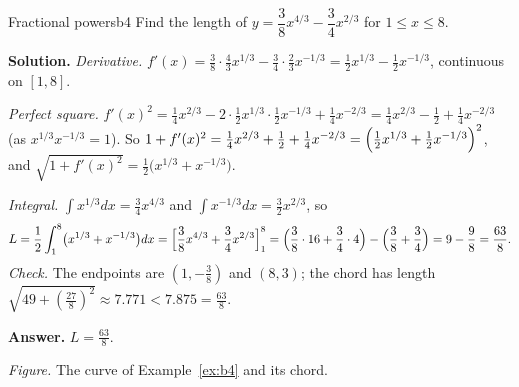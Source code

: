 \documentclass[11pt]{article}
\begin{document}
\begin{exmp}{Fractional powers}{b4}
Find the length of $y=\dfrac38x^{4/3}-\dfrac34x^{2/3}$ for $1\le x\le8$.

\textbf{Solution.} \emph{Derivative.} $f'(x)=\frac38\cdot\frac43x^{1/3}-\frac34\cdot\frac23x^{-1/3}=\frac12x^{1/3}-\frac12x^{-1/3}$, continuous on $[1,8]$.

\emph{Perfect square.} $f'(x)^2=\frac14x^{2/3}-2\cdot\frac12x^{1/3}\cdot\frac12x^{-1/3}+\frac14x^{-2/3}=\frac14x^{2/3}-\frac12+\frac14x^{-2/3}$ (as $x^{1/3}x^{-1/3}=1$). So $1+f'(x)^2=\frac14x^{2/3}+\frac12+\frac14x^{-2/3}=\Bigl(\frac12x^{1/3}+\frac12x^{-1/3}\Bigr)^2$, and $\sqrt{1+f'(x)^2}=\frac12\bigl(x^{1/3}+x^{-1/3}\bigr)$.

\emph{Integral.} $\int x^{1/3}dx=\frac34x^{4/3}$ and $\int x^{-1/3}dx=\frac32x^{2/3}$, so
\[
L=\frac12\int_1^8\bigl(x^{1/3}+x^{-1/3}\bigr)dx=\Bigl[\frac38x^{4/3}+\frac34x^{2/3}\Bigr]_1^8=\Bigl(\frac38\cdot16+\frac34\cdot4\Bigr)-\Bigl(\frac38+\frac34\Bigr)=9-\frac98=\frac{63}8 .
\]
\emph{Check.} The endpoints are $(1,-\frac38)$ and $(8,3)$; the chord has length $\sqrt{49+(\frac{27}8)^2}\approx7.771<7.875=\frac{63}8$.

\textbf{Answer.} $L=\frac{63}8$.
\begin{center}
\par\small\emph{Figure.} The curve of Example~\ref{ex:b4} and its chord.
\end{center}
\end{exmp}
\end{document}
